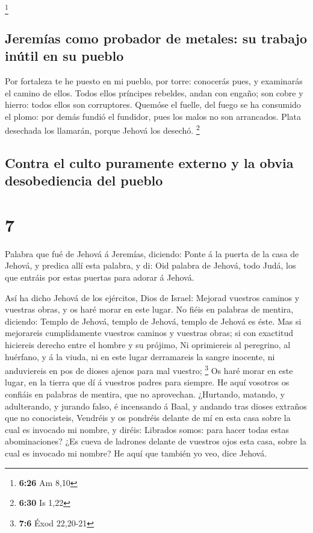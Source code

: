 \footnote{\textbf{6:26} Am 8,10}

\hypertarget{jeremuxedas-como-probador-de-metales-su-trabajo-inuxfatil-en-su-pueblo}{%
\subsection{Jeremías como probador de metales: su trabajo inútil en su
pueblo}\label{jeremuxedas-como-probador-de-metales-su-trabajo-inuxfatil-en-su-pueblo}}

 Por fortaleza te he puesto en mi pueblo, por torre:
conocerás pues, y examinarás el camino de ellos.  Todos
ellos príncipes rebeldes, andan con engaño; son cobre y hierro: todos
ellos son corruptores.  Quemóse el fuelle, del fuego se
ha consumido el plomo: por demás fundió el fundidor, pues los malos no
son arrancados.  Plata desechada los llamarán, porque
Jehová los desechó. \footnote{\textbf{6:30} Is 1,22}

\hypertarget{contra-el-culto-puramente-externo-y-la-obvia-desobediencia-del-pueblo}{%
\subsection{Contra el culto puramente externo y la obvia desobediencia
del
pueblo}\label{contra-el-culto-puramente-externo-y-la-obvia-desobediencia-del-pueblo}}

\hypertarget{section-6}{%
\section{7}\label{section-6}}

 Palabra que fué de Jehová á Jeremías, diciendo:
 Ponte á la puerta de la casa de Jehová, y predica allí
esta palabra, y di: Oid palabra de Jehová, todo Judá, los que entráis
por estas puertas para adorar á Jehová.

 Así ha dicho Jehová de los ejércitos, Dios de Israel:
Mejorad vuestros caminos y vuestras obras, y os haré morar en este
lugar.  No fiéis en palabras de mentira, diciendo: Templo
de Jehová, templo de Jehová, templo de Jehová es éste. 
Mas si mejorareis cumplidamente vuestros caminos y vuestras obras; si
con exactitud hiciereis derecho entre el hombre y su prójimo,
 Ni oprimiereis al peregrino, al huérfano, y á la viuda,
ni en este lugar derramareis la sangre inocente, ni anduviereis en pos
de dioses ajenos para mal vuestro; \footnote{\textbf{7:6} Éxod 22,20-21}
 Os haré morar en este lugar, en la tierra que dí á
vuestros padres para siempre.  He aquí vosotros os
confiáis en palabras de mentira, que no aprovechan. 
¿Hurtando, matando, y adulterando, y jurando falso, é incensando á Baal,
y andando tras dioses extraños que no conocisteis, 
Vendréis y os pondréis delante de mí en esta casa sobre la cual es
invocado mi nombre, y diréis: Librados somos: para hacer todas estas
abominaciones?  ¿Es cueva de ladrones delante de vuestros
ojos esta casa, sobre la cual es invocado mi nombre? He aquí que también
yo veo, dice Jehová.

